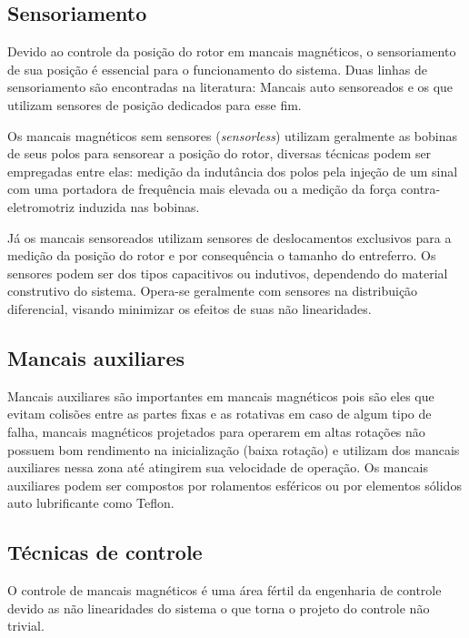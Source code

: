 \subsection{Sensoriamento}

 Devido ao controle da posição do rotor em mancais magnéticos, o sensoriamento de sua posição é essencial para o funcionamento do sistema. Duas linhas de sensoriamento são encontradas na literatura: Mancais auto sensoreados \citep{Vischer1993} e os que utilizam sensores de posição dedicados para esse fim.

 Os mancais magnéticos sem sensores (\textit{sensorless}) utilizam geralmente as bobinas de seus polos para sensorear a posição do rotor, diversas técnicas podem ser empregadas \citep{Hofer2009a, Mukhopadhyay2005} entre elas: medição da indutância dos polos pela injeção de um sinal com uma portadora de frequência mais elevada ou a medição da força contra-eletromotriz induzida nas bobinas.
 
 Já os mancais sensoreados utilizam sensores de deslocamentos exclusivos para a medição da posição do rotor e por consequência o tamanho do entreferro. Os sensores podem ser dos tipos capacitivos ou indutivos, dependendo do material construtivo do sistema. Opera-se geralmente com sensores na distribuição diferencial, visando minimizar os efeitos de suas não linearidades.
 
\subsection{Mancais auxiliares}

 Mancais auxiliares são importantes em mancais magnéticos pois são eles que evitam colisões entre as partes fixas e as rotativas em caso de algum tipo de falha, mancais magnéticos projetados para operarem em altas rotações não possuem bom rendimento na inicialização  (baixa rotação) e utilizam dos mancais auxiliares nessa zona até atingirem sua velocidade de operação. Os mancais auxiliares podem ser compostos por rolamentos esféricos \citep{Sun2004a} ou por elementos sólidos auto lubrificante como Teflon.
 
\subsection{Técnicas de controle}

O controle de mancais magnéticos é uma área fértil da engenharia de controle devido as não linearidades do sistema o que torna o projeto do controle não trivial.  

